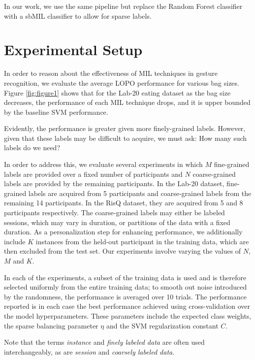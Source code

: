 \documentclass{sigchi}
\begin{document}
In our work, we use the same pipeline but replace the Random Forest classifier with a sbMIL classifier to allow for sparse labels.

\section{Experimental Setup}

In order to reason about the effectiveness of MIL techniques in gesture recognition, we evaluate the average LOPO performance for various bag sizes. Figure \ref{fig:figure1} shows that for the Lab-20 eating dataset as the bag size decreases, the performance of each MIL technique drops, and it is upper bounded by the baseline SVM performance.

Evidently, the performance is greater given more finely-grained labels. However, given that these labels may be difficult to acquire, we must ask: How many such labels do we need?

In order to address this, we evaluate several experiments in which $M$ fine-grained labels are provided over a fixed number of participants and $N$ coarse-grained labels are provided by the remaining participants. In the Lab-20 dataset, fine-grained labels are acquired from 5 participants and coarse-grained labels from the remaining 14 participants. In the RisQ dataset, they are acquired from 5 and 8 participants respectively. The coarse-grained labels may either be labeled sessions, which may vary in duration, or partitions of the data with a fixed duration. As a personalization step for enhancing performance, we additionally include $K$ instances from the held-out participant in the training data, which are then excluded from the test set. Our experiments involve varying the values of $N$, $M$ and $K$.

In each of the experiments, a subset of the training data is used and is therefore selected uniformly from the entire training data; to smooth out noise introduced by the randomness, the performance is averaged over 10 trials. The performance reported is in each case the best performance achieved using cross-validation over the model hyperparameters. These parameters include the expected class weights, the sparse balancing parameter $\eta$ and the SVM regularization constant $C$.

Note that the terms \textit{instance} and \textit{finely labeled data} are often used interchangeably, as are \textit{session} and \textit{coarsely labeled data}.
\end{document}
